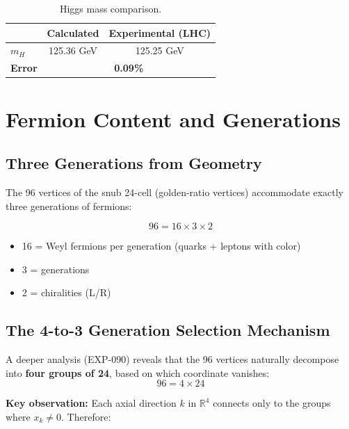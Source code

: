 \documentclass[12pt,a4paper]{article}
\begin{document}
\begin{table}[H]
\centering
\begin{tabular}{lcc}
\toprule
& \textbf{Calculated} & \textbf{Experimental (LHC)} \\
\midrule
$m_H$ & 125.36 GeV & 125.25 GeV \\
\textbf{Error} & \multicolumn{2}{c}{\textbf{0.09\%}} \\
\bottomrule
\end{tabular}
\caption{Higgs mass comparison.}
\end{table}


\section{Fermion Content and Generations}

\subsection{Three Generations from Geometry}

The 96 vertices of the snub 24-cell (golden-ratio vertices) accommodate exactly three generations of fermions:

\begin{equation}
96 = 16 \times 3 \times 2
\end{equation}

\begin{itemize}
    \item 16 = Weyl fermions per generation (quarks + leptons with color)
    \item 3 = generations
    \item 2 = chiralities (L/R)
\end{itemize}

\subsection{The 4-to-3 Generation Selection Mechanism}

A deeper analysis (EXP-090) reveals that the 96 vertices naturally decompose into \textbf{four groups of 24}, based on which coordinate vanishes:
\begin{equation}
96 = 4 \times 24
\end{equation}

\textbf{Key observation:} Each axial direction $k$ in $\mathbb{R}^4$ connects only to the groups where $x_k \neq 0$. Therefore:
\end{document}
